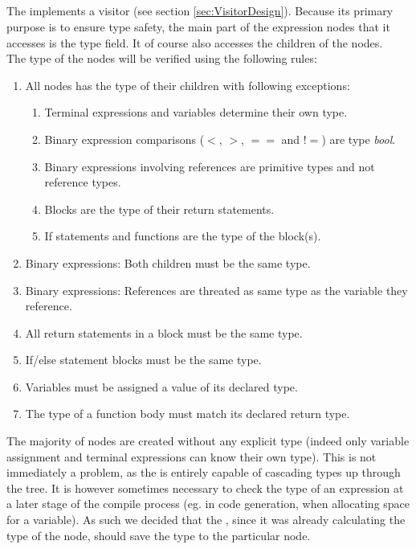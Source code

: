 \subsection{\typeChecker{}}
\label{sec:typeCheckerDesign}
The \typeChecker{} implements a visitor (see section \ref{sec:VisitorDesign}). 
Because its primary purpose is to ensure type safety, the main part of the expression
nodes that it accesses is the type field. It of course also accesses the children of
the nodes.\\

The type of the nodes will be verified using the following rules:
\begin{enumerate}

\item All nodes has the type of their children with following exceptions:
\begin{enumerate}
\item Terminal expressions and variables determine their own type.
\item Binary expression comparisons ($<$, $>$, $==$ and $!=$) are type \textit{bool}.
\item Binary expressions involving references are primitive types and not reference
  types.
\item Blocks are the type of their return statements. 
\item If statements and functions are the type of the block(s).
\end{enumerate}
\item Binary expressions: Both children must be the same type.
\item Binary expressions: References are threated as same type as the
  variable they reference.
\item All return statements in a block must be the same type.
\item If/else statement blocks must be the same type.
\item Variables must be assigned a value of its declared type.
\item The type of a function body must match its declared return type.
\end{enumerate}

The majority of nodes are created without any explicit type (indeed only variable
assignment and terminal expressions can know their own type). This is not immediately
a problem, as the \typeChecker{} is entirely capable of cascading types up through the
tree. It is however sometimes necessary to check the type of an expression at a later
stage of the compile process (eg. in code generation, when allocating space for a
variable). As such we decided that the \typeChecker, since it was already calculating
the type of the node, should save the type to the particular node.

